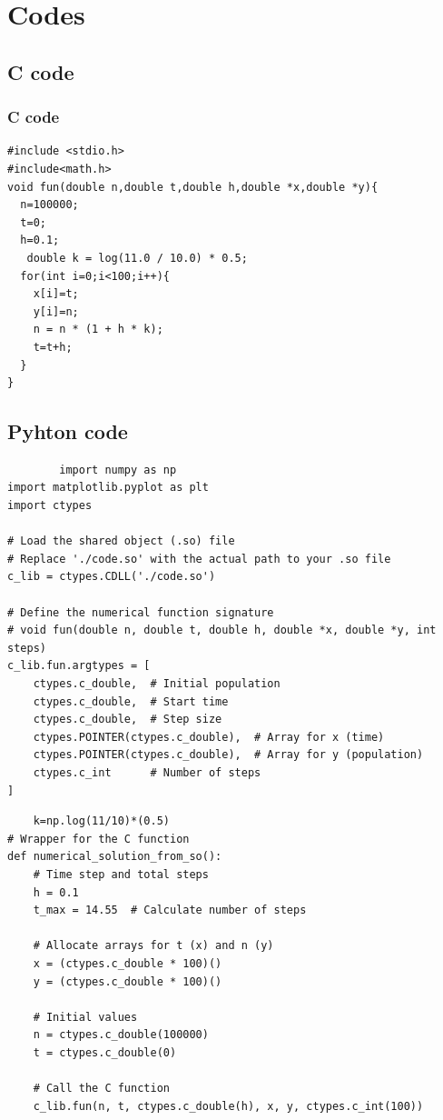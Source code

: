 \documentclass{beamer}
\theoremstyle{remark}
\numberwithin{equation}{section}
\begin{document}
\section{Codes}
\subsection{C code}
\begin{frame}[fragile]
\frametitle{C code}
    \begin{lstlisting}
#include <stdio.h>
#include<math.h>
void fun(double n,double t,double h,double *x,double *y){
  n=100000;
  t=0;
  h=0.1;
   double k = log(11.0 / 10.0) * 0.5;
  for(int i=0;i<100;i++){
    x[i]=t;
    y[i]=n;
    n = n * (1 + h * k); 
    t=t+h;
  }
}
\end{lstlisting}
\end{frame}
\subsection{Pyhton code}
\begin{frame}[fragile]
    \begin{lstlisting}
        import numpy as np
import matplotlib.pyplot as plt
import ctypes

# Load the shared object (.so) file
# Replace './code.so' with the actual path to your .so file
c_lib = ctypes.CDLL('./code.so')

# Define the numerical function signature
# void fun(double n, double t, double h, double *x, double *y, int steps)
c_lib.fun.argtypes = [
    ctypes.c_double,  # Initial population
    ctypes.c_double,  # Start time
    ctypes.c_double,  # Step size
    ctypes.POINTER(ctypes.c_double),  # Array for x (time)
    ctypes.POINTER(ctypes.c_double),  # Array for y (population)
    ctypes.c_int      # Number of steps
]
    \end{lstlisting}
\end{frame}
\begin{frame}[fragile]
\begin{lstlisting}
    k=np.log(11/10)*(0.5)
# Wrapper for the C function
def numerical_solution_from_so():
    # Time step and total steps
    h = 0.1
    t_max = 14.55  # Calculate number of steps

    # Allocate arrays for t (x) and n (y)
    x = (ctypes.c_double * 100)()
    y = (ctypes.c_double * 100)()
    
    # Initial values
    n = ctypes.c_double(100000)
    t = ctypes.c_double(0)
    
    # Call the C function
    c_lib.fun(n, t, ctypes.c_double(h), x, y, ctypes.c_int(100))
    \end{lstlisting}
\end{frame}
\end{document}
